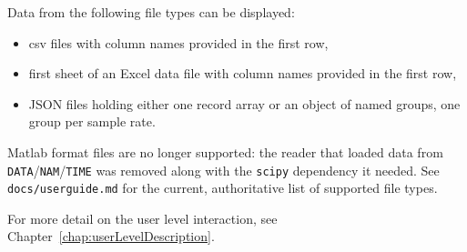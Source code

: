 Data from the following file types can be displayed:
\begin{itemize}
  \item \ac{csv} files with column names provided in the first row,
  \item first sheet of an Excel data file with column names provided in the first row,
  \item \ac{JSON} files holding either one record array or an object of named groups, one group per sample rate.
\end{itemize}

Matlab format files are no longer supported: the reader that loaded data
from \texttt{DATA}/\texttt{NAM}/\texttt{TIME} was removed along with the
\texttt{scipy} dependency it needed. See \texttt{docs/userguide.md} for the
current, authoritative list of supported file types.

For more detail on the user level interaction, see Chapter~\ref{chap:userLevelDescription}.
